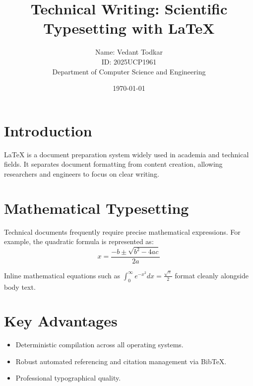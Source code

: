 \documentclass[11pt,a4paper]{article}
\title{\textbf{Technical Writing: Scientific Typesetting with \LaTeX}}
\author{Name: Vedant Todkar  \\ ID: 2025UCP1961 \\ Department of Computer Science and Engineering }
\date{\today}
\begin{document}
\maketitle

\section{Introduction}
\LaTeX{} is a document preparation system widely used in academia and technical fields. It separates document formatting from content creation, allowing researchers and engineers to focus on clear writing.

\section{Mathematical Typesetting}
Technical documents frequently require precise mathematical expressions. For example, the quadratic formula is represented as:
\begin{equation}
x = \frac{-b \pm \sqrt{b^2 - 4ac}}{2a}
\end{equation}

Inline mathematical equations such as $\int_{0}^{\infty} e^{-x^2} dx = \frac{\sqrt{\pi}}{2}$ format cleanly alongside body text.

\section{Key Advantages}
\begin{itemize}
    \item Deterministic compilation across all operating systems.
    \item Robust automated referencing and citation management via Bib\TeX.
    \item Professional typographical quality.
\end{itemize}
\end{document}
